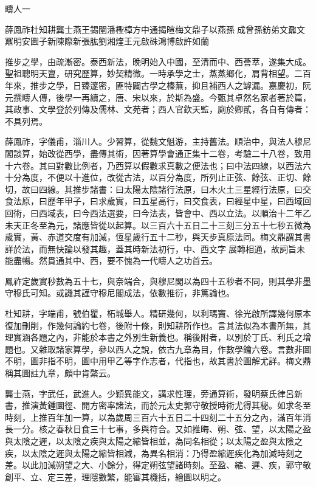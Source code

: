 
\begin{pinyinscope}
疇人一

薛鳳祚杜知耕龔士燕王錫闡潘檉樟方中通揭暄梅文鼎子以燕孫成曾孫鈁弟文鼐文鼏明安圖子新陳際新張肱劉湘煃王元啟硃鴻博啟許如蘭

推步之學，由疏漸密。泰西新法，晚明始入中國，至清而中、西薈萃，遂集大成。聖祖聰明天亶，研究歷算，妙契精微。一時承學之士，蒸蒸鄉化，肩背相望。二百年來，推步之學，日臻邃密，匪特闢古學之榛蕪，抑且補西人之罅漏。嘉慶初，阮元撰疇人傳，後學一再續之，唐、宋以來，於斯為盛。今甄其卓然名家者著於篇，其政事、文學登於列傳及儒林、文苑者；西人官欽天監，廁於卿貳，各自有傳者：不具列焉。

薛鳳祚，字儀甫，淄川人。少習算，從魏文魁游，主持舊法。順治中，與法人穆尼閣談算，始改從西學，盡傳其術，因著算學會通正集十二卷，考驗二十八卷，致用十六卷。其曰對數比例者，乃西算以假數求真數之便法也；曰中法四線，以西法六十分為度，不便以十進位，改從古法，以百分為度，所列止正弦、餘弦、正切、餘切，故曰四線。其推步諸書：曰太陽太陰諸行法原，曰木火土三星經行法原，曰交食法原，曰歷年甲子，曰求歲實，曰五星高行，曰交食表，曰經星中星，曰西域回回術，曰西域表，曰今西法選要，曰今法表，皆會中、西以立法。以順治十二年乙未天正冬至為元，諸應皆從以起算。以三百六十五日二十三刻三分五十七秒五微為歲實，黃、赤道交度有加減，恆星歲行五十二秒，與天步真原法同。梅文鼎謂其書詳於法，而無快論以發其趣，蓋其時新法初行，中、西文字展轉相通，故詞旨未能盡暢。然貫通其中、西，要不愧為一代疇人之功首云。

鳳祚定歲實秒數為五十七，與奈端合，與穆尼閣以為四十五秒者不同，則其學非墨守穆氏可知。或譏其謹守穆尼閣成法，依數推衍，非篤論也。

杜知耕，字端甫，號伯瞿，柘城舉人。精研幾何，以利瑪竇、徐光啟所譯幾何原本復加刪削，作幾何論約七卷，後附十條，則知耕所作也。言其法似為本書所無，其理實涵各題之內，非能於本書之外別生新義也。稱後附者，以別於丁氏、利氏之增題也。又雜取諸家算學，參以西人之說，依古九章為目，作數學鑰六卷。言數非圖不明，圖非指不明，圖中用甲乙等字作志者，代指也，故其書於圖解尤詳。梅文鼎稱其圖註九章，頗中肯綮云。

龔士燕，字武任，武進人。少穎異能文，講求性理，旁通算術，發明蔡氏律呂新書，推演黃鍾圜徑、開方密率諸法，而於元太史郭守敬授時術尤得其秘。如求冬至時刻，上推百年加一算，以為歲周三百六十五日二十四刻二十五分之內，滿百年消長一分。核之春秋日食三十七事，多與符合。又如推晦、朔、弦、望，以太陽之盈與太陰之遲，以太陰之疾與太陽之縮皆相並，為同名相從；以太陽之盈與太陰之疾，以太陰之遲與太陽之縮皆相減，為異名相消：乃得盈縮遲疾化為加減時刻之差。以此加減朔望之大、小餘分，得定朔弦望諸時刻。至盈、縮、遲、疾，郭守敬創平、立、定三差，理隱數繁，能審其機括，繪圖以明之。


\end{pinyinscope}

